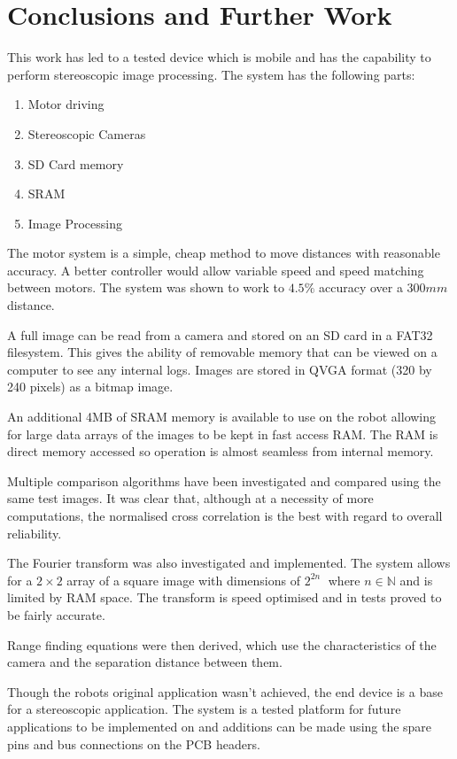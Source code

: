 \chapter{Conclusions and Further Work} \label{Chapter: Conclusions}

This work has led to a tested device which is mobile and has the capability to perform stereoscopic image processing. The system has the following parts:

\begin{enumerate}
\item Motor driving
\item Stereoscopic Cameras
\item SD Card memory
\item SRAM
\item Image Processing
\end{enumerate} 

The motor system is a simple, cheap method to move distances with reasonable accuracy. A better controller would allow variable speed and speed matching between motors. The system was shown to work to $4.5\%$ accuracy over a $300mm$ distance.

A full image can be read from a camera and stored on an SD card in a FAT32 filesystem. This gives the ability of removable memory that can be viewed on a computer to see any internal logs. Images are stored in QVGA format (320 by 240 pixels) as a bitmap image. 

An additional 4MB of SRAM memory is available to use on the robot allowing for large data arrays of the images to be kept in fast access RAM. The RAM is direct memory accessed so operation is almost seamless from internal memory.

Multiple comparison algorithms have been investigated and compared using the same test images. It was clear that, although at a necessity of more computations, the normalised cross correlation is the best with regard to overall reliability. 

The Fourier transform was also investigated and implemented. The system allows for a $2 \times 2$ array of a square image with dimensions of $2^{2n}\; $ where $n \in \mathbb{N}$ and is limited by RAM space. The transform is speed optimised and in tests proved to be fairly accurate.

Range finding equations were then derived, which use the characteristics of the camera and the separation distance between them. 



Though the robots original application wasn't achieved, the end device is a base for a stereoscopic application. The system is a tested platform for future applications to be implemented on and additions can be made using the spare pins and bus connections on the PCB headers. 
